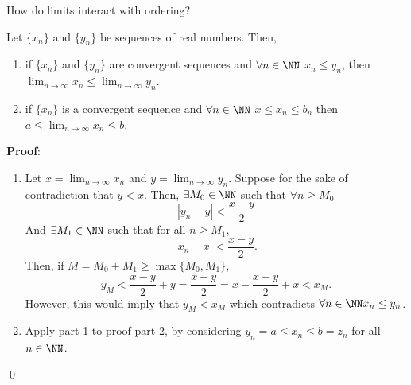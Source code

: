 \begin{question}
How do limits interact with ordering? 
\end{question}

\begin{theorem}
Let $\{x_n\}$ and $\{y_n\}$ be sequences of real numbers. Then,
\begin{enumerate}
    \item if $\{x_n\}$ and $\{y_n\}$ are convergent sequences and $\forall n\in \NN$ $x_n\leq y_n$, then \\ $\lim_{n\to \infty} x_n \leq \lim_{n\to \infty}y_n.$
    \item if $\{x_n\}$ is a convergent sequence and $\forall n\in\NN$ $x\leq x_n \leq b_n$ then $a\leq \lim_{n\to \infty} x_n \leq b$.
\end{enumerate}
\end{theorem}
\textbf{Proof}: 
\begin{enumerate}
    \item Let $x = \lim_{n\to \infty} x_n$ and $y = \lim_{n\to\infty} y_n$. Suppose for the sake of contradiction that $y< x$. Then, $\exists M_0\in\NN$ such that $\forall n\geq M_0$
    \[
    |y_n - y|< \frac{x-y}{2}
    \]
    And $\exists M_1 \in\NN$ such that for all $n\geq M_1$,
    \[
    |x_n -x| < \frac{x-y}{2}.
    \]
    Then, if $M = M_0+M_1 \geq \max\{M_0,M_1\}$,
    \[
    y_M < \frac{x-y}{2} +y = \frac{x+y}{2} = x-\frac{x-y}{2}+x < x_M.
    \]
    However, this would imply that $y_M < x_M$ which contradicts $\forall n\in\NN x_n \leq y_n$.
    \item Apply part 1 to proof part 2, by considering $y_n = a \leq x_n \leq b = z_n$ for all $n\in\NN$.
\end{enumerate} \qed 

